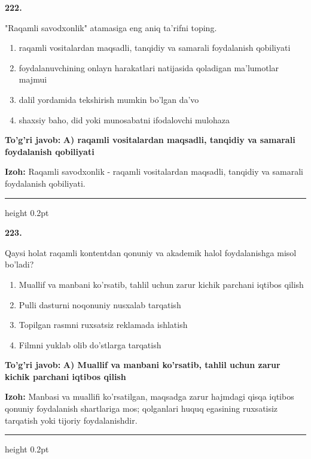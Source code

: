 \documentclass[10pt,a4paper,oneside]{article}
\begin{document}
\noindent\textbf{\color{ink}222.}
\par
"Raqamli savodxonlik" atamasiga eng aniq ta'rifni toping.
\begin{enumerate}[label=\Alph*),leftmargin=9mm]
\item raqamli vositalardan maqsadli, tanqidiy va samarali foydalanish qobiliyati
\item foydalanuvchining onlayn harakatlari natijasida qoladigan ma'lumotlar majmui
\item dalil yordamida tekshirish mumkin bo'lgan da'vo
\item shaxsiy baho, did yoki munosabatni ifodalovchi mulohaza
\end{enumerate}
\begin{tcolorbox}[enhanced,breakable,colback=teal!4,colframe=teal!50!black,boxrule=0.5pt,arc=1.1mm,left=3mm,right=3mm,top=1.7mm,bottom=1.7mm,before skip=2mm,after skip=2mm]
\textbf{\color{teal}To'g'ri javob:} \textbf{A) raqamli vositalardan maqsadli, tanqidiy va samarali foydalanish qobiliyati}
\par\smallskip
\textbf{Izoh:} Raqamli savodxonlik - raqamli vositalardan maqsadli, tanqidiy va samarali foydalanish qobiliyati.
\end{tcolorbox}
\vspace{2mm}\hrule height 0.2pt \vspace{3mm}

\noindent\textbf{\color{ink}223.}
\par
Qaysi holat raqamli kontentdan qonuniy va akademik halol foydalanishga misol bo'ladi?
\begin{enumerate}[label=\Alph*),leftmargin=9mm]
\item Muallif va manbani ko'rsatib, tahlil uchun zarur kichik parchani iqtibos qilish
\item Pulli dasturni noqonuniy nusxalab tarqatish
\item Topilgan rasmni ruxsatsiz reklamada ishlatish
\item Filmni yuklab olib do'stlarga tarqatish
\end{enumerate}
\begin{tcolorbox}[enhanced,breakable,colback=teal!4,colframe=teal!50!black,boxrule=0.5pt,arc=1.1mm,left=3mm,right=3mm,top=1.7mm,bottom=1.7mm,before skip=2mm,after skip=2mm]
\textbf{\color{teal}To'g'ri javob:} \textbf{A) Muallif va manbani ko'rsatib, tahlil uchun zarur kichik parchani iqtibos qilish}
\par\smallskip
\textbf{Izoh:} Manbasi va muallifi ko'rsatilgan, maqsadga zarur hajmdagi qisqa iqtibos qonuniy foydalanish shartlariga mos; qolganlari huquq egasining ruxsatisiz tarqatish yoki tijoriy foydalanishdir.
\end{tcolorbox}
\vspace{2mm}\hrule height 0.2pt \vspace{3mm}
\end{document}
